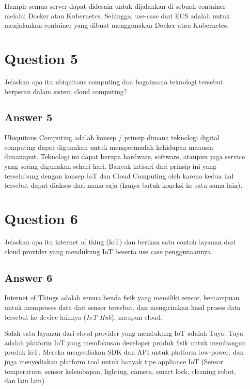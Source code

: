 \documentclass[
	11pt, %
	indonesian
]{assignment}
\begin{document}
Hampir semua server dapat didesain untuk dijalankan di sebuah container melalui Docker atau Kubernetes. Sehingga, use-case dari ECS adalah untuk menjalankan container yang dibuat menggunakan Docker atau Kubernetes.

\section*{Question 5}
\begin{problem}
Jelaskan apa itu ubiquitous computing dan bagaimana teknologi tersebut berperan dalam sistem cloud computing?
\end{problem}

\subsection*{Answer 5}

Ubiquitous Computing adalah konsep / prinsip dimana teknologi digital computing dapat digunakan untuk mempermudah kehidupan manusia dimanaput. Teknologi ini dapat berupa hardware, software, ataupun juga service yang sering digunakan sehari hari. Banyak intisari dari prinsip ini yang terselubung dengan konsep IoT dan Cloud Computing oleh karena kedua hal tersebut dapat diakses dari mana saja (hanya butuh koneksi ke satu sama lain).

\section*{Question 6}
\begin{problem}
Jelaskan apa itu internet of thing (IoT) dan berikan satu contoh layanan dari cloud provider yang mendukung IoT beserta use case penggunaannya.
\end{problem}

\subsection*{Answer 6}

Internet of Things adalah semua benda fisik yang memiliki sensor, kemampuan untuk memproses data dari sensor tersebut, dan mengirimkan hasil proses data tersebut ke device lainnya (\textit{IoT Hub}), maupun cloud.

Salah satu layanan dari cloud provider yang mendukung IoT adalah Tuya. Tuya adalah platform IoT yang memfokusan developer produk fisik untuk membangun produk IoT. Mereka menyediakan SDK dan API untuk platform low-power, dan juga menyediakan platform tool untuk banyak tipe appliance IoT (Sensor temperature, sensor kelembapan, lighting, camera, smart lock, cleaning robot, dan lain lain)
\end{document}
